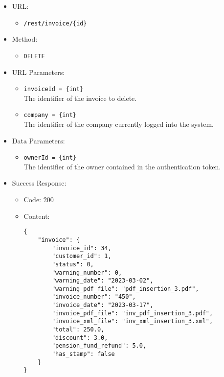 \begin{itemize}
    
    \item URL: 
    \begin{itemize}
        \item \texttt{/rest/invoice/\{id\}}
    \end{itemize}

    \item Method: 
    \begin{itemize}
        \item \texttt{DELETE}
    \end{itemize}
    
    \item URL Parameters: 
    \begin{itemize}
        \item \texttt{invoiceId = \{int\}} \\
        The identifier of the invoice to delete.
        \item \texttt{company = \{int\}} \\
        The identifier of the company currently logged into the system.
    \end{itemize}
    
    \item Data Parameters: 
    \begin{itemize}
        \item \texttt{ownerId = \{int\}} \\
        The identifier of the owner contained in the authentication token.
    \end{itemize}
    
    \item Success Response: 
    \begin{itemize}
        \item Code: 200
        \item Content:
        \begin{lstlisting}
{
    "invoice": {
        "invoice_id": 34,
        "customer_id": 1,
        "status": 0,
        "warning_number": 0,
        "warning_date": "2023-03-02",
        "warning_pdf_file": "pdf_insertion_3.pdf",
        "invoice_number": "450",
        "invoice_date": "2023-03-17",
        "invoice_pdf_file": "inv_pdf_insertion_3.pdf",
        "invoice_xml_file": "inv_xml_insertion_3.xml",
        "total": 250.0,
        "discount": 3.0,
        "pension_fund_refund": 5.0,
        "has_stamp": false
    }
}
        \end{lstlisting}    
    \end{itemize}
    

\end{itemize}
